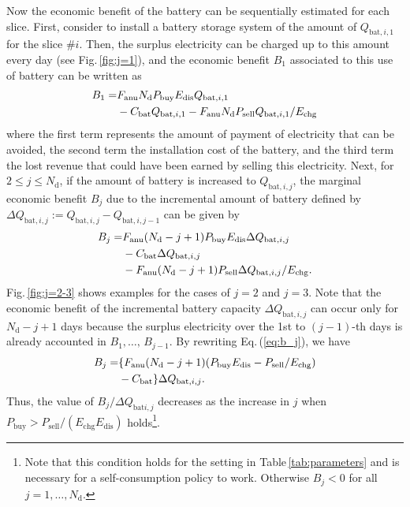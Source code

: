 \documentclass[lettersize,journal]{IEEEtran}
\newcommand{\eref}[1]{Eq.\,(\ref{#1})}
\newcommand{\figref}[1]{Fig.\,\ref{#1}}
\newcommand{\tabref}[1]{Table\,\ref{#1}}
\begin{document}
%
Now the economic benefit of the battery can be sequentially estimated for each slice. 
First, consider to install a battery storage system of the amount of $Q_{\mathrm{bat},i,1}$ for the slice $\# i$. 
Then, the surplus electricity can be charged up to this amount every day (see \figref{fig:j=1}), and  
the economic benefit $B_1$ associated to this use of battery can be written as
\begin{align}
 B_1 =
  &  F_\mathrm{anu} N_\mathrm{d} P_\mathrm{buy} E_\mathrm{dis} Q_{\mathrm{bat},i, 1} \notag \\ 
  & - C_\mathrm{bat} Q_{\mathrm{bat},i, 1}  - F_\mathrm{anu} N_\mathrm{d}  P_\mathrm{sell} Q_{\mathrm{bat},i, 1}/E_\mathrm{chg}
\end{align}
where the first term represents the amount of payment of electricity that can be avoided, the second term the installation cost of the battery, and the third term the lost revenue that could have been earned by selling this electricity. 
Next, for $2  \le j \le N_\mathrm{d}$,  if the amount of battery is increased to $Q_{\mathrm{bat},i,j}$, the marginal economic benefit $B_j$ due to the incremental amount of battery defined by $\Delta Q_{\mathrm{bat},i,j} := Q_{\mathrm{bat},i,j} - Q_{\mathrm{bat},i,j-1}$ can be given by 
\begin{align}
 B_j = 
 &  F_\mathrm{anu} (N_\mathrm{d}-j+ 1)  P_\mathrm{buy} E_\mathrm{dis}\Delta Q_{\mathrm{bat},i, j}  \notag \\
 & - C_\mathrm{bat} \Delta Q_{\mathrm{bat},i, j}  \notag \\  &  - F_\mathrm{anu} (N_\mathrm{d} -j+ 1) P_\mathrm{sell} \Delta Q_{\mathrm{bat},i, j}/E_\mathrm{chg}.   \label{eq:b_j}
\end{align}
\figref{fig:j=2-3} shows examples for the cases of $j = 2$ and $j=3$. 
Note that the economic benefit of the incremental battery capacity $\Delta Q_{\mathrm{bat},i,j}$ can occur only for $N_\mathrm{d} -j + 1$ days because the surplus electricity over the 1st to $(j-1)$-th days is already accounted in $B_1, \dots,\, B_{j-1}$. 
By rewriting \eref{eq:b_j}, we have 
\begin{align}
 B_j = 
 & \{ F_\mathrm{anu} (N_\mathrm{d}-j+ 1) (P_\mathrm{buy} E_\mathrm{dis}-P_\mathrm{sell} /E_\mathrm{chg})   \notag \\
 & - C_\mathrm{bat} \} \Delta Q_{\mathrm{bat},i, j}. 
\end{align}
Thus, the value of $ B_j/\Delta Q_{\mathrm{bat}i,j}$ decreases as the increase in $j$ when $P_\mathrm{buy} > P_\mathrm{sell} /(E_\mathrm{chg}E_\mathrm{dis})$ holds\footnote{Note that this condition holds for the setting in \tabref{tab:parameters} and is necessary for a self-consumption policy to work. Otherwise $B_j < 0$ for all $j = 1, \dots, N_\mathrm{d}$.}.  
\end{document}
